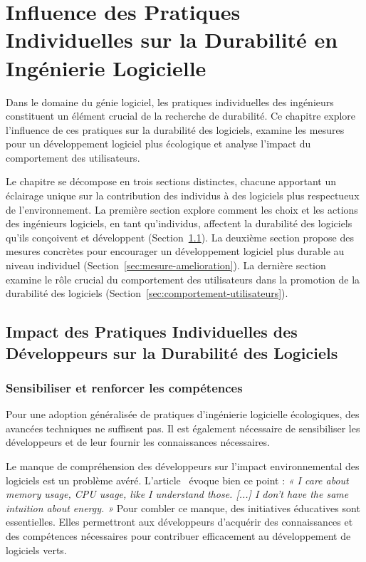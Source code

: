 
\chapter{Influence des Pratiques Individuelles sur la Durabilité en Ingénierie Logicielle}	%
\label{pratique-durabilite}
Dans le domaine du génie logiciel, les pratiques individuelles des ingénieurs constituent un élément crucial de la recherche de durabilité. Ce chapitre explore l'influence de ces pratiques sur la durabilité des logiciels, examine les mesures pour un développement logiciel plus écologique et analyse l'impact du comportement des utilisateurs.


Le chapitre se décompose en trois sections distinctes, chacune apportant un éclairage unique sur la contribution des individus à des logiciels plus respectueux de l'environnement. La première section explore comment les choix et les actions des ingénieurs logiciels, en tant qu'individus, affectent la durabilité des logiciels qu'ils conçoivent et développent (Section~\ref{sec:pratiques-individuelles}). La deuxième section propose des mesures concrètes pour encourager un développement logiciel plus durable au niveau individuel (Section~\ref{sec:mesure-amelioration}). La dernière section examine le rôle crucial du comportement des utilisateurs dans la promotion de la durabilité des logiciels (Section~\ref{sec:comportement-utilisateurs}).


\section{Impact des Pratiques Individuelles des Développeurs sur la Durabilité des Logiciels}
\label{sec:pratiques-individuelles}

\subsection{Sensibiliser et renforcer les compétences}

Pour une adoption généralisée de pratiques d'ingénierie logicielle écologiques, des avancées techniques ne suffisent pas. Il est également nécessaire de sensibiliser les développeurs et de leur fournir les connaissances nécessaires.


Le manque de compréhension des développeurs sur l'impact environnemental des logiciels est un problème avéré. L'article~\cite{EmpiricalStudy} évoque bien ce point : \emph{« I care about memory usage, CPU usage, like I understand those. [...] I don’t have the same intuition about energy. »} Pour combler ce manque, des initiatives éducatives sont essentielles. Elles permettront aux développeurs d'acquérir des connaissances et des compétences nécessaires pour contribuer efficacement au développement de logiciels verts.


